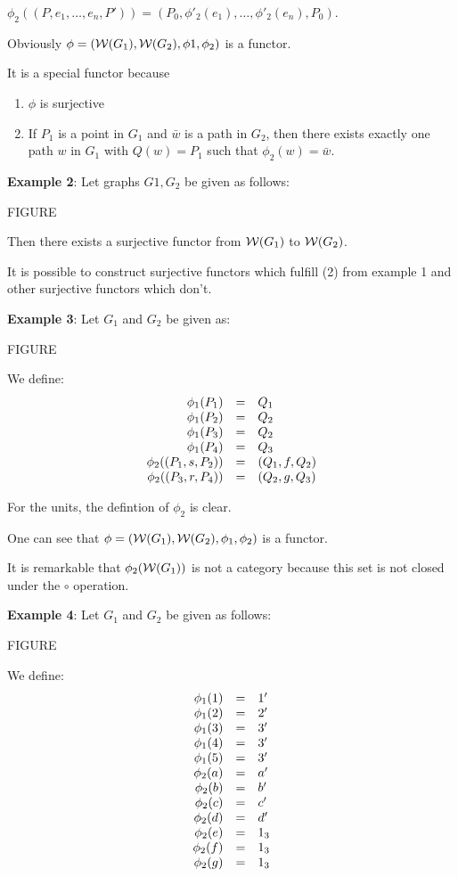 $\phi_2((P, e_1, \ldots, e_n, P')) = (P_0, \phi'_2(e_1), \ldots, \phi'_2(e_n),
P_0)$.

Obviously $\phi = (\mbox{$\mathcal{W}(G_1)$}, \mbox{$\mathcal{W}(G_2)$}, \phi1, \phi_2)$ is a
functor.

It is a special functor because

\begin{enumerate}
  \item $\phi$ is surjective
  \item If $P_1$ is a point in $G_1$ and $\bar{w}$ is a path in $G_2$, then
  there exists exactly one path $w$ in $G_1$ with $Q(w) = P_1$ such that
  $\phi_2(w) = \bar{w}$.
\end{enumerate}

{\bf Example 2}: Let graphs $G1, G_2$ be given as follows:

FIGURE

Then there exists a surjective functor from $\mbox{$\mathcal{W}(G_1)$}$ to
$\mbox{$\mathcal{W}(G_2)$}$.

It is possible to construct surjective functors which fulfill (2) from example 1
and other surjective functors which don't.

{\bf Example 3}: Let $G_1$ and $G_2$ be given as:

FIGURE

We define: 
\[ \begin{array}{r@{\quad = \quad}l}
\phi_1(P_1) & Q_1 \\
\phi_1(P_2) & Q_2 \\
\phi_1(P_3) & Q_2 \\
\phi_1(P_4) & Q_3 \\
\phi_2((P_1, s, P_2)) & (Q_1, f, Q_2) \\
\phi_2((P_3, r, P_4)) & (Q_2, g, Q_3)
\end{array} \]

For the units, the defintion of $\phi_2$ is clear. 

One can see that $\phi = (\mbox{$\mathcal{W}(G_1)$}, \mbox{$\mathcal{W}(G_2)$}, \phi_1, \phi_2)$
is a functor.

It is remarkable that $\phi_2(\mbox{$\mathcal{W}(G_1)$})$ is not a category because this
set is not closed under the $\circ$ operation.

{\bf Example 4}: Let $G_1$ and $G_2$ be given as follows:

FIGURE

We define:
\[ \begin{array}{r@{\quad = \quad}l}
\phi_1(1) & 1' \\
\phi_1(2) & 2' \\
\phi_1(3) & 3' \\
\phi_1(4) & 3' \\
\phi_1(5) & 3' \\
\phi_2(a) & a' \\
\phi_2(b) & b' \\
\phi_2(c) & c' \\
\phi_2(d) & d' \\
\phi_2(e) & 1_3 \\
\phi_2(f) & 1_3 \\
\phi_2(g) & 1_3
\end{array} \]

